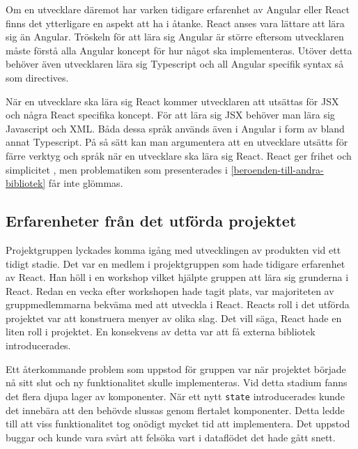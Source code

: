 Om en utvecklare däremot har varken tidigare erfarenhet av Angular eller React finns det ytterligare en aspekt att ha i åtanke. React anses vara lättare att lära sig än Angular.\cite[Adoption, Learning Curve and Development Experience]{sitepoint} Tröskeln för att lära sig Angular är större eftersom utvecklaren måste förstå alla Angular koncept för hur något ska implementeras. Utöver detta behöver även utvecklaren lära sig Typescript och all Angular specifik syntax så som directives. 

När en utvecklare ska lära sig React kommer utvecklaren att utsättas för JSX och några React specifika koncept. För att lära sig JSX behöver man lära sig Javascript och XML. Båda dessa språk används även i Angular i form av bland annat Typescript. På så sätt kan man argumentera att en utvecklare utsätts för färre verktyg och språk när en utvecklare ska lära sig React. React ger frihet och simplicitet \cite{react-angular-paper}, men problematiken som presenterades i \ref{beroenden-till-andra-bibliotek} får inte glömmas.

\subsection{Erfarenheter från det utförda projektet}
Projektgruppen lyckades komma igång med utvecklingen av produkten vid ett tidigt stadie. Det var en medlem i projektgruppen som hade tidigare erfarenhet av React. Han höll i en workshop vilket hjälpte gruppen att lära sig grunderna i React. Redan en vecka efter workshopen hade tagit plats, var majoriteten av gruppmedlemmarna bekväma med att utveckla i React. Reacts roll i det utförda projektet var att konstruera menyer av olika slag. Det vill säga, React hade en liten roll i projektet. En konsekvens av detta var att få externa bibliotek introducerades. 

Ett återkommande problem som uppstod för gruppen var när projektet började nå sitt slut och ny funktionalitet skulle implementeras. Vid detta stadium fanns det flera djupa lager av komponenter. När ett nytt \texttt{state} introducerades kunde det innebära att den behövde slussas genom flertalet komponenter. Detta ledde till att viss funktionalitet tog onödigt mycket tid att implementera. Det uppstod buggar och kunde vara svårt att felsöka vart i dataflödet det hade gått snett. 


